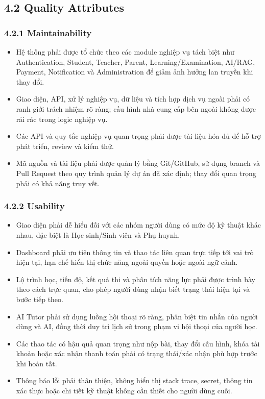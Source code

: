 \documentclass[12pt,a4paper,oneside]{report}
\begin{document}
\subsection*{4.2 Quality Attributes}

\subsubsection*{4.2.1 Maintainability}

\begin{itemize}
    \item Hệ thống phải được tổ chức theo các module nghiệp vụ tách biệt như Authentication, Student, Teacher, Parent, Learning/Examination, AI/RAG, Payment, Notification và Administration để giảm ảnh hưởng lan truyền khi thay đổi.
    \item Giao diện, API, xử lý nghiệp vụ, dữ liệu và tích hợp dịch vụ ngoài phải có ranh giới trách nhiệm rõ ràng; cấu hình nhà cung cấp bên ngoài không được rải rác trong logic nghiệp vụ.
    \item Các API và quy tắc nghiệp vụ quan trọng phải được tài liệu hóa đủ để hỗ trợ phát triển, review và kiểm thử.
    \item Mã nguồn và tài liệu phải được quản lý bằng Git/GitHub, sử dụng branch và Pull Request theo quy trình quản lý dự án đã xác định; thay đổi quan trọng phải có khả năng truy vết.
\end{itemize}

\subsubsection*{4.2.2 Usability}

\begin{itemize}
    \item Giao diện phải dễ hiểu đối với các nhóm người dùng có mức độ kỹ thuật khác nhau, đặc biệt là Học sinh/Sinh viên và Phụ huynh.
    \item Dashboard phải ưu tiên thông tin và thao tác liên quan trực tiếp tới vai trò hiện tại, hạn chế hiển thị chức năng ngoài quyền hoặc ngoài ngữ cảnh.
    \item Lộ trình học, tiến độ, kết quả thi và phân tích năng lực phải được trình bày theo cách trực quan, cho phép người dùng nhận biết trạng thái hiện tại và bước tiếp theo.
    \item AI Tutor phải sử dụng luồng hội thoại rõ ràng, phân biệt tin nhắn của người dùng và AI, đồng thời duy trì lịch sử trong phạm vi hội thoại của người học.
    \item Các thao tác có hậu quả quan trọng như nộp bài, thay đổi cấu hình, khóa tài khoản hoặc xác nhận thanh toán phải có trạng thái/xác nhận phù hợp trước khi hoàn tất.
    \item Thông báo lỗi phải thân thiện, không hiển thị stack trace, secret, thông tin xác thực hoặc chi tiết kỹ thuật không cần thiết cho người dùng cuối.
\end{itemize}
\end{document}
